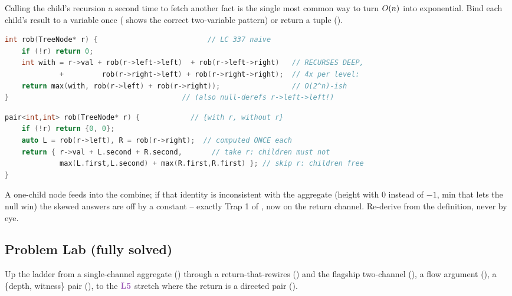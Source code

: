 \begin{warningbox}
Calling the child's recursion a second time to fetch another fact is the single
most common way to turn $O(n)$ into exponential. Bind each child's result to
a variable once ( shows the correct two-variable pattern) or
return a tuple ().
\end{warningbox}
\begin{lstlisting}[caption={\textcolor{warningred}{WRONG}: recomputes each child's summary inside the combine}, language=C++, basicstyle=\ttfamily\small]
int rob(TreeNode* r) {                          // LC 337 naive
    if (!r) return 0;
    int with = r->val + rob(r->left->left)  + rob(r->left->right)   // RECURSES DEEP,
             +         rob(r->right->left) + rob(r->right->right);  // 4x per level:
    return max(with, rob(r->left) + rob(r->right));                 // O(2^n)-ish
}                                         // (also null-derefs r->left->left!)
\end{lstlisting}
\begin{lstlisting}[caption={\textcolor{successgreen}{RIGHT}: each child reports a pair once}, language=C++, basicstyle=\ttfamily\small]
pair<int,int> rob(TreeNode* r) {            // {with r, without r}
    if (!r) return {0, 0};
    auto L = rob(r->left), R = rob(r->right);  // computed ONCE each
    return { r->val + L.second + R.second,       // take r: children must not
             max(L.first,L.second) + max(R.first,R.first) }; // skip r: children free
}
\end{lstlisting}

\begin{warningbox}
A one-child node feeds  into the combine; if that identity is
inconsistent with the aggregate (height with $0$ instead of $-1$, min that lets
the null win) the skewed answers are off by a constant -- exactly Trap 1 of
, now on the return channel. Re-derive  from
the definition, never by eye.
\end{warningbox}

\subsection{Problem Lab (fully solved)}

Up the ladder from a single-channel aggregate () through a
return-that-rewires () and the flagship two-channel
(), a flow argument (), a
\{depth, witness\} pair (), to the $\lv5$ stretch where the
return is a directed pair ().

